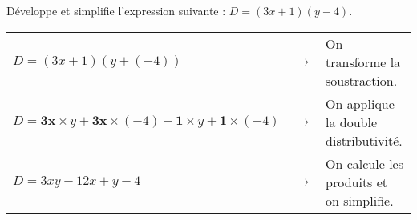 \begin{exemple*1}

Développe et simplifie l'expression suivante : $D = (3x + 1)(y - 4)$.

\correction

\begin{tabular}{lcl}
$D = (3x + 1)(y + (- 4))$ & $\longrightarrow$ & On transforme la soustraction. \\
$D = \boldsymbol{3x \times} y + \boldsymbol{3x \times} (- 4) + \boldsymbol{1 \times} y + \boldsymbol{1 \times} (- 4)$ & $\longrightarrow$ & On applique la double distributivité. \\
$D = 3xy - 12x + y - 4$ & $\longrightarrow$ & On calcule les produits et on simplifie. \\
\end{tabular}
\end{exemple*1}






